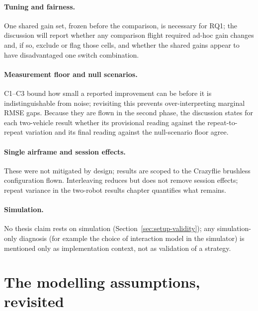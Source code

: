 \paragraph{Tuning and fairness.} One shared gain set, frozen before the comparison, is necessary for
RQ1; the discussion will report whether any comparison flight required ad-hoc gain changes and, if
so, exclude or flag those cells, and whether the shared gains appear to have disadvantaged one
switch combination.

\paragraph{Measurement floor and null scenarios.} C1--C3 bound how small a reported improvement can
be before it is indistinguishable from noise; revisiting this prevents over-interpreting marginal
RMSE gaps. Because they are flown in the second phase, the discussion states for each two-vehicle
result whether its provisional reading against the repeat-to-repeat variation and its final reading
against the null-scenario floor agree.

\paragraph{Single airframe and session effects.} These were not mitigated by design; results are
scoped to the Crazyflie brushless configuration flown. Interleaving reduces but does not remove
session effects; repeat variance in the two-robot results chapter quantifies what remains.

\paragraph{Simulation.} No thesis claim rests on simulation (Section~\ref{sec:setup-validity});
any simulation-only diagnosis (for example the choice of interaction model in the simulator) is
mentioned only as implementation context, not as validation of a strategy.


\section{The modelling assumptions, revisited}
\label{sec:disc-assumptions}

